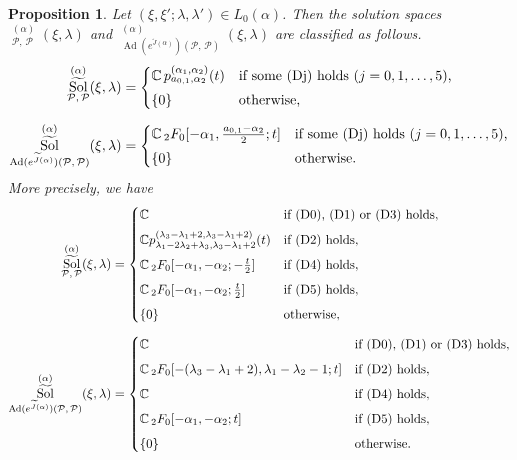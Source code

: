 \documentclass[a4paper,11pt,reqno]{amsart}
\newcommand{\CC}{\mathbb{C}}
\newcommand{\calP}{\mathcal{P}}
\newcommand{\0}{{\bf 0}}
\newcommand{\C}{\mathbb{C}}
\newcommand{\1}{{\bf 1}}
\DeclareMathOperator{\Ad}{Ad}
\DeclareMathOperator{\Sol}{Sol}
\newcommand{\wJ}{\widetilde{J}}
\DeclareMathOperator{\wSol}{\widetilde{\Sol}}
\theoremstyle{plain}
\newtheorem{proposition}[equation]{Proposition}
\theoremstyle{definition}
\numberwithin{equation}{section}
\theoremstyle{definition}
\begin{document}
\begin{proposition}\label{eqn:SolPP}
Let $(\xi,\xi';\lambda,\lambda')\in L_0(\alpha)$.
Then the solution spaces 
$\wSol_{\calP,\, \calP}^{(\alpha)}(\xi,\lambda)$
and
$\wSol_{\Ad(e^{\wJ(\alpha)})(\calP,\, \calP)}^{(\alpha)}
(\xi,\lambda)$
are classified as follows.
\begin{align}
\wSol_{\calP,\, \calP}^{(\alpha)}(\xi,\lambda)
&=
\begin{cases}
\CC\,
p_{a_{0,1},\alpha_2}^{(\alpha_1,\alpha_2)}(t) & 
\textnormal{if some (Dj) holds ($j=0,1,\ldots,5$),}\\[3pt]
\{0\} & \textnormal{otherwise,}
\end{cases}\label{eqn:SolCayPP}\\[5pt]
\wSol_{\Ad(e^{\wJ(\alpha)})(\calP,\, \calP)}^{(\alpha)}
(\xi,\lambda)
&=
\begin{cases}
\CC\,
{}_2F_0[-\alpha_1,\tfrac{a_{0,1}-\alpha_2}{2};t]
& 
\textnormal{if some (Dj) holds ($j=0,1,\ldots,5$),}\\[3pt]
\{0\} & \textnormal{otherwise.}
\end{cases}\label{eqn:Sol2F0PP}
\end{align}
More precisely, we have
\begin{align}
\wSol_{\calP,\, \calP}^{(\alpha)}(\xi,\lambda)
&=
\begin{cases}
\C & \textnormal{if (D0), (D1) or (D3) holds},\\[5pt]
\C p^{(\lambda_3-\lambda_1+2,\lambda_3-\lambda_1+2)}_{\lambda_1-2\lambda_2+\lambda_3,\lambda_3-\lambda_1+2}(t) & \textnormal{if (D2) holds},\\[5pt]
\C\,{}_2F_0[-\alpha_1,-\alpha_2;-\tfrac{t}{2}]& \textnormal{if (D4) holds},\\[5pt]
\C\,{}_2F_0[-\alpha_1,-\alpha_2;\tfrac{t}{2}]& \textnormal{if (D5) holds},\\[5pt]
\{0\} & \textnormal{otherwise},
\end{cases}\label{eqn:PP}\\[5pt]
\wSol_{\Ad(e^{\wJ(\alpha)})(\calP,\, \calP)}^{(\alpha)}
(\xi,\lambda)
&=
\begin{cases}
\C & \textnormal{if (D0), (D1) or (D3)  holds},\\[5pt]
\C\,{}_2F_0[-(\lambda_3-\lambda_1+2),\lambda_1-\lambda_2-1;t]& \textnormal{if (D2) holds},\\[5pt]
\C & \textnormal{if (D4) holds},\\[5pt]
\C\,{}_2F_0[-\alpha_1,-\alpha_2;t]& \textnormal{if (D5) holds},\\[5pt]
\{0\} & \textnormal{otherwise}.
\end{cases}\label{eqn:Ad_PP}
\end{align}
\end{proposition}
\end{document}
